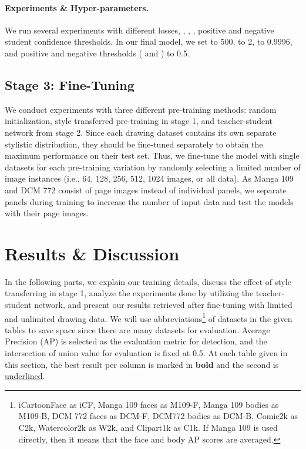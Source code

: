 \documentclass{article}
\begin{document}
\paragraph{Experiments \& Hyper-parameters.}{We run several experiments with different losses, , , , positive and negative student confidence thresholds. In our final model, we set  to 500,  to 2,  to 0.9996, and positive and negative thresholds ( and ) to 0.5.}

\subsection{Stage 3: Fine-Tuning}

We conduct experiments with three different pre-training methods: random initialization, style transferred pre-training in stage 1, and teacher-student network from stage 2. Since each drawing dataset contains its own separate stylistic distribution, they should be fine-tuned separately to obtain the maximum performance on their test set. Thus, we fine-tune the model with single datasets for each pre-training variation by randomly selecting a limited number of image instances (i.e., 64, 128, 256, 512, 1024 images, or all data). As Manga 109 and DCM 772 consist of page images instead of individual panels, we separate panels during training to increase the number of input data and test the models with their page images.

\section{Results \& Discussion}
\label{section:res_exp}

In the following parts, we explain our training details, discuss the effect of style transferring in stage 1, analyze the experiments done by utilizing the teacher-student network, and present our results retrieved after fine-tuning with limited and unlimited drawing data. We will use abbreviations\footnote{iCartoonFace as iCF, Manga 109 faces as M109-F,  Manga 109 bodies as M109-B,  DCM 772 faces as DCM-F, DCM772 bodies as DCM-B, Comic2k as C2k, Watercolor2k as W2k, and Clipart1k as C1k. If Manga 109 is used directly, then it means that the face and body AP scores are averaged.} of datasets in the given tables to save space since there are many datasets for evaluation. Average Precision (AP) is selected as the evaluation metric for detection, and the intersection of union value for evaluation is fixed at 0.5. At each table given in this section, the best result per column is marked in \textbf{bold} and the second is \underline{underlined}.
\end{document}
